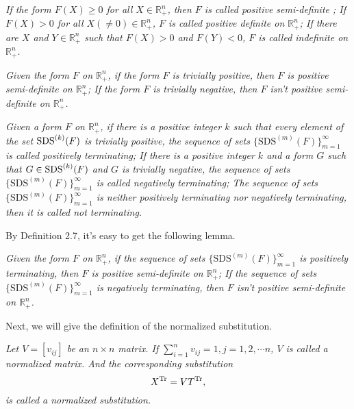 \documentclass [10pt,a4paper]{article}
\begin{document}
\begin{definition}
   \emph{ If the form
   $F(X)\geq0$  for all $X\in\mathbb{R}_+^n$,  then $F$ is called positive semi-def\mbox{}inite ; If
   $F(X)>0$  for all $X(\neq0)\in\mathbb{R}_+^n$,
   $F$ is called positive def\mbox{}inite on
   $\mathbb{R}_+^n$; If there are $X$ and $Y\in \mathbb{R}_+^n$
such that $F(X)>0$ and  $F(Y)<0$,
   $F$ is called indef\mbox{}inite on
   $\mathbb{R}_+^n$. }
\end{definition}

  \begin{lemma}  \label{zpft}
\emph{Given the form $F$ on   $\mathbb{R}_+^n$, if the form $F$ is
trivially positive, then  $F$ is positive semi-def\mbox{}inite on
   $\mathbb{R}_+^n$; If the
form $F$ is trivially negative, then  $F$ isn't positive
semi-def\mbox{}inite on
   $\mathbb{R}_+^n$. }
\end{lemma}


\begin{definition}\label{deft}
\emph{Given a form $F$ on   $\mathbb{R}_+^n$, if there is a positive
integer $k$ such that every element of the set
$\textmd{SDS}^{(k)}(F)$ is trivially positive, the sequence of sets
$\{\textrm{SDS}^{(m)}(F)\}_{m=1}^\infty$ is called positively
terminating;  If there is a positive integer $k$ and a form $G$ such
that $G\in \textmd{SDS}^{(k)}(F)$ and $G$ is trivially negative, the
sequence of sets $\{\textrm{SDS}^{(m)}(F)\}_{m=1}^\infty$ is called
negatively terminating;   The sequence of sets
$\{\textrm{SDS}^{(m)}(F)\}_{m=1}^\infty$ is neither positively
terminating nor negatively terminating, then it is called not
terminating.}
 \end{definition}

  By Definition 2.7, it's easy to get the following lemma.

    \begin{lemma}
\emph{Given the form $F$ on   $\mathbb{R}_+^n$, if the sequence of
sets $\{\textrm{SDS}^{(m)}(F)\}_{m=1}^\infty$ is positively
terminating, then  $F$ is positive semi-def\mbox{}inite on
   $\mathbb{R}_+^n$; If the
sequence of sets $\{\textrm{SDS}^{(m)}(F)\}_{m=1}^\infty$ is
negatively terminating, then  $F$ isn't positive
semi-def\mbox{}inite on
   $\mathbb{R}_+^n$. }
\end{lemma}


Next, we will give the def\mbox{}inition of the normalized
substitution.

\begin{definition}
   \emph{Let $V=[v_{ij}]$ be an $n\times n$ matrix. If $\sum\limits_{i=1}^nv_{ij}=1, j=1,2,\cdots
   n$, $V$ is called a normalized matrix.  And the corresponding substitution
   \begin{displaymath}
X^{\textmd{Tr}}=VT^{\textmd{Tr}},
\end{displaymath}}
\emph{is called a normalized substitution.}
    \end{definition}
\end{document}
